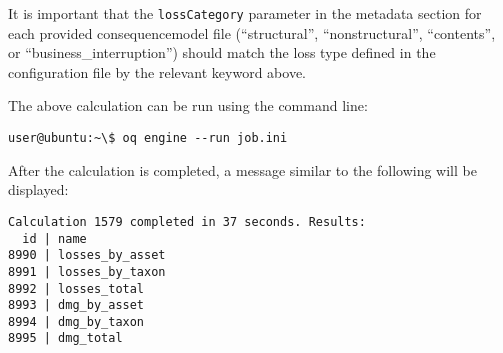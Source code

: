 It is important that the \Verb+lossCategory+ parameter in the metadata section
for each provided \gls{consequencemodel} file (``structural'', ``nonstructural'',
``contents'', or ``business\_interruption'') should match the loss type
defined in the configuration file by the relevant keyword above.

The above calculation can be run using the command line:

\begin{verbatim}
user@ubuntu:~\$ oq engine --run job.ini
\end{verbatim}

After the calculation is completed, a message similar to the following will be
displayed:

\begin{verbatim}
Calculation 1579 completed in 37 seconds. Results:
  id | name
8990 | losses_by_asset
8991 | losses_by_taxon
8992 | losses_total
8993 | dmg_by_asset
8994 | dmg_by_taxon
8995 | dmg_total
\end{verbatim}
